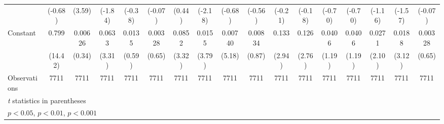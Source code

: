 \begin{table}[htbp]
\begin{tabular}{l*{16}{c}}
                    &     (-0.68)         &      (3.59)         &     (-1.84)         &     (-0.38)         &     (-0.07)         &      (0.44)         &     (-2.18)         &     (-0.68)         &     (-0.56)         &     (-0.21)         &     (-0.18)         &     (-0.70)         &     (-0.70)         &     (-1.16)         &     (-1.57)         &     (-0.07)         \\
\addlinespace
Constant            &       0.799\sym{***}&     0.00626         &      0.0633\sym{***}&      0.0135         &     0.00328         &      0.0852\sym{***}&      0.0155\sym{***}&     0.00740\sym{***}&     0.00834         &       0.133\sym{**} &       0.126\sym{**} &      0.0406         &      0.0406         &      0.0271\sym{*}  &      0.0188\sym{**} &     0.00328         \\
                    &     (14.42)         &      (0.34)         &      (3.31)         &      (0.59)         &      (0.65)         &      (3.32)         &      (3.79)         &      (5.18)         &      (0.87)         &      (2.94)         &      (2.76)         &      (1.19)         &      (1.19)         &      (2.10)         &      (3.12)         &      (0.65)         \\
\midrule
Observations        &        7711         &        7711         &        7711         &        7711         &        7711         &        7711         &        7711         &        7711         &        7711         &        7711         &        7711         &        7711         &        7711         &        7711         &        7711         &        7711         \\
\bottomrule
\multicolumn{17}{l}{\footnotesize \textit{t} statistics in parentheses}\\
\multicolumn{17}{l}{\footnotesize \sym{*} \(p<0.05\), \sym{**} \(p<0.01\), \sym{***} \(p<0.001\)}\\
\end{tabular}
\end{table}
